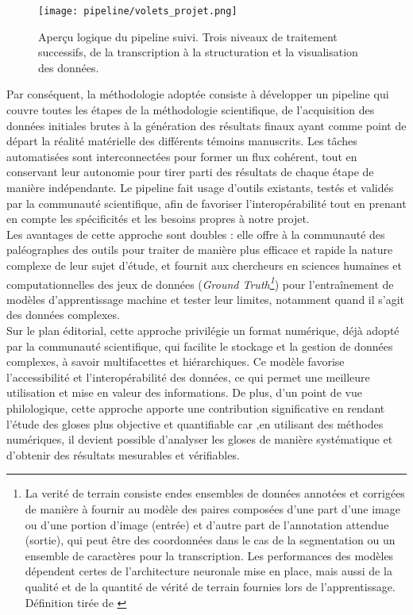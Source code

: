 \documentclass[a4paper, twoside, 12pt]{book}
\begin{document}
\begin{figure}[H]
    \centering
    \texttt{[image: pipeline/volets\_projet.png]}
    \caption{Aperçu logique du pipeline suivi. Trois niveaux de traitement successifs, de la transcription à la structuration et la visualisation des données.}
\end{figure}

Par conséquent, la méthodologie adoptée consiste à développer un pipeline qui couvre toutes les étapes de la méthodologie scientifique, de l'acquisition des données initiales brutes à la génération des résultats finaux ayant comme point de départ la réalité matérielle des différents témoins manuscrits. Les tâches automatisées sont interconnectées pour former un flux cohérent, tout en conservant leur autonomie pour tirer parti des résultats de chaque étape de manière indépendante. Le pipeline fait usage d'outils existants, testés et validés par la communauté scientifique, afin de favoriser l'interopérabilité tout en prenant en compte les spécificités et les besoins propres à notre projet.\\

Les avantages de cette approche sont doubles : elle offre à la communauté des paléographes des outils pour traiter de manière plus efficace et rapide la nature complexe de leur sujet d'étude, et fournit aux chercheurs en sciences humaines et computationnelles des jeux de données (\textit{Ground Truth\footnote{La verité de terrain consiste en\og{}des ensembles de données annotées et corrigées de manière à fournir au modèle des paires composées d'une part d'une image ou d'une portion d'image (entrée) et d'autre part de l’annotation attendue (sortie), qui peut être des coordonnées dans le cas de la segmentation ou un ensemble de caractères pour la transcription. Les performances des modèles dépendent certes de l'architecture neuronale mise en place, mais aussi de la qualité et de la quantité de vérité de terrain fournies lors de l'apprentissage.\fg{} Définition tirée de \cite{chague2021htr}}}) pour l'entraînement de modèles d'apprentissage machine et tester leur limites, notamment quand il s'agit des données complexes.\\

Sur le plan éditorial, cette approche privilégie un format numérique, déjà adopté par la communauté scientifique, qui facilite le stockage et la gestion de données complexes, à savoir multifacettes et hiérarchiques. Ce modèle favorise l'accessibilité et l'interopérabilité des données, ce qui permet une meilleure utilisation et mise en valeur des informations. De plus, d'un point de vue philologique, cette approche apporte une contribution significative en rendant l'étude des gloses plus objective et quantifiable car ,en utilisant des méthodes numériques, il devient possible d'analyser les gloses de manière systématique et d'obtenir des résultats mesurables et vérifiables. \\
\end{document}
